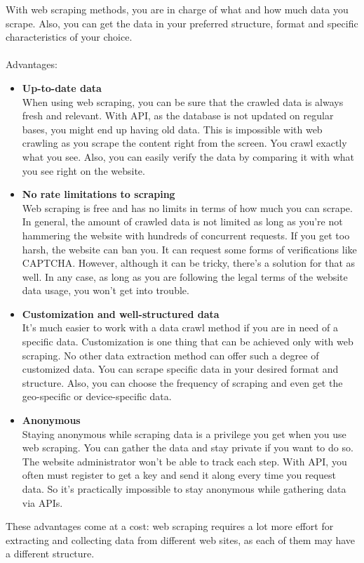 \documentclass[10pt,a4paper]{article}
\newcommand{\nline}{\\~\\}
\begin{document}
With web scraping methods, you are in charge of what and how much data you scrape. Also, you can get the data in your preferred structure, format and specific characteristics of your choice.
\nline
Advantages:
\begin{itemize}
	\item \textbf{Up-to-date data} \\
When using web scraping, you can be sure that the crawled data is always fresh and relevant. With API, as the database is not updated on regular bases, you might end up having old data. This is impossible with web crawling as you scrape the content right from the screen. You crawl exactly what you see. Also, you can easily verify the data by comparing it with what you see right on the website.
	\item \textbf{No rate limitations to scraping} \\
Web scraping is free and has no limits in terms of how much you can scrape. In general, the amount of crawled data is not limited as long as you’re not hammering the website with hundreds of concurrent requests. If you get too harsh, the website can ban you. It can request some forms of verifications like CAPTCHA. However, although it can be tricky, there’s a solution for that as well. In any case, as long as you are following the legal terms of the website data usage, you won’t get into trouble.
	\item \textbf{Customization and well-structured data} \\
It’s much easier to work with a data crawl method if you are in need of a specific data. Customization is one thing that can be achieved only with web scraping. No other data extraction method can offer such a degree of customized data. You can scrape specific data in your desired format and structure. Also, you can choose the frequency of scraping and even get the geo-specific or device-specific data.
	\item \textbf{Anonymous} \\
Staying anonymous while scraping data is a privilege you get when you use web scraping. You can gather the data and stay private if you want to do so. The website administrator won’t be able to track each step. With API, you often must register to get a key and send it along every time you request data. So it’s practically impossible to stay anonymous while gathering data via APIs.
\end{itemize}
These advantages come at a cost: web scraping requires a lot more effort for extracting and collecting data from different web sites, as each of them may have a different structure.
\end{document}
